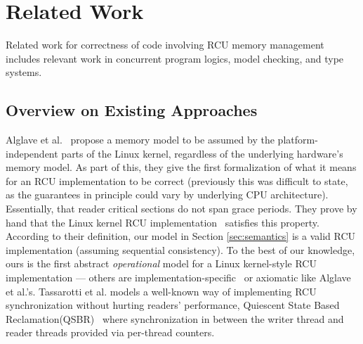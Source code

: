 \section{Related Work}
\label{sec:relatedwork}
Related work for correctness of code involving RCU memory management includes relevant work in concurrent program logics, model checking, and type systems.
\subsection{Overview on Existing Approaches}
Alglave et al.~\cite{Alglave:2018:FSC:3173162.3177156} propose a memory model to be assumed by the platform-independent parts of the Linux kernel, regardless of the underlying hardware's memory model.
As part of this, they give the first formalization of what it means for an RCU implementation to be correct (previously this was difficult to state, as the guarantees in principle could vary by underlying CPU architecture). Essentially, that reader critical sections do not span grace periods.  They prove by hand that the Linux kernel RCU implementation~\cite{DBLP:conf/cav/AlglaveKT13,abssem} satisfies this property. 
According to their definition, our model in Section \ref{sec:semantics} is a valid RCU implementation (assuming sequential consistency).
To the best of our knowledge, ours is the first abstract \emph{operational} model for a Linux kernel-style RCU implementation --- others are implementation-specific~\cite{Mandrykin:2016:TDV:3001219.3001297} or axiomatic like Alglave et al.'s. Tassarotti et al. models a well-known way of implementing RCU synchronization without hurting readers' performance, \textsf{Quiescent State Based Reclamation}(QSBR)~\cite{urcu_ieee} where synchronization in between the writer thread and reader threads provided via per-thread counters. 

